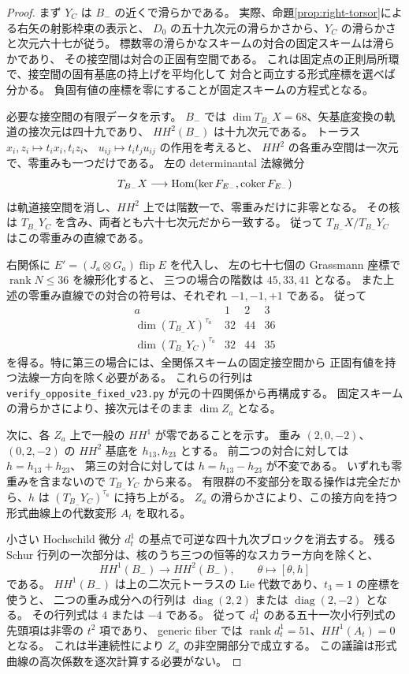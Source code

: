 \begin{proof}
まず $Y_C$ は $B_-$ の近くで滑らかである。
実際、命題\ref{prop:right-torsor}による右矢の射影枠束の表示と、
$D_0$ の五十九次元の滑らかさから、$Y_C$ の滑らかさと次元六十七が従う。
標数零の滑らかなスキームの対合の固定スキームは滑らかであり、
その接空間は対合の正固有空間である。
これは固定点の正則局所環で、接空間の固有基底の持上げを平均化して
対合と両立する形式座標を選べば分かる。
負固有値の座標を零にすることが固定スキームの方程式となる。

必要な接空間の有限データを示す。
$B_-$ では $\dim T_{B_-}X=68$、矢基底変換の軌道の接次元は四十九であり、
$HH^2(B_-)$ は十九次元である。
トーラス $x_i,z_i\mapsto t_ix_i,t_iz_i$、
$u_{ij}\mapsto t_it_ju_{ij}$ の作用を考えると、
$HH^2$ の各重み空間は一次元で、零重みも一つだけである。
左の determinantal 法線微分
\[
 T_{B_-}X\longrightarrow
 \operatorname{Hom}(\ker F_{E_-},\operatorname{coker} F_{E_-})
\]
は軌道接空間を消し、$HH^2$ 上では階数一で、零重みだけに非零となる。
その核は $T_{B_-}Y_C$ を含み、両者とも六十七次元だから一致する。
従って $T_{B_-}X/T_{B_-}Y_C$ はこの零重みの直線である。

右関係に $E'=(J_a\otimes G_a)\operatorname{flip}E$ を代入し、
左の七十七個の Grassmann 座標で $\operatorname{rank}N\le36$ を線形化すると、
三つの場合の階数は $45,33,41$ となる。
また上述の零重み直線での対合の符号は、それぞれ $-1,-1,+1$ である。
従って
\[
\begin{array}{c|ccc}
 a&1&2&3\\\hline
 \dim(T_{B_-}X)^{\tau_a}&32&44&36\\
 \dim(T_{B_-}Y_C)^{\tau_a}&32&44&35
\end{array}
\]
を得る。特に第三の場合には、全関係スキームの固定接空間から
正固有値を持つ法線一方向を除く必要がある。
これらの行列は \nolinkurl{verify_opposite_fixed_v23.py} が元の十四関係から再構成する。
固定スキームの滑らかさにより、接次元はそのまま $\dim Z_a$ となる。

次に、各 $Z_a$ 上で一般の $HH^1$ が零であることを示す。
重み $(2,0,-2)$、$(0,2,-2)$ の $HH^2$ 基底を $h_{13},h_{23}$ とする。
前二つの対合に対しては $h=h_{13}+h_{23}$、
第三の対合に対しては $h=h_{13}-h_{23}$ が不変である。
いずれも零重みを含まないので $T_{B_-}Y_C$ から来る。
有限群の不変部分を取る操作は完全だから、$h$ は $(T_{B_-}Y_C)^{\tau_a}$ に持ち上がる。
$Z_a$ の滑らかさにより、この接方向を持つ形式曲線上の代数変形 $A_t$ を取れる。

小さい Hochschild 微分 $d^1_t$ の基点で可逆な四十九次ブロックを消去する。
残る Schur 行列の一次部分は、核のうち三つの恒等的なスカラー方向を除くと、
\[
 HH^1(B_-)\longrightarrow HH^2(B_-),\qquad
 \theta\longmapsto[\theta,h]
\]
である。
$HH^1(B_-)$ は上の二次元トーラスの Lie 代数であり、$t_3=1$ の座標を使うと、
二つの重み成分への行列は $\operatorname{diag}(2,2)$ または $\operatorname{diag}(2,-2)$ となる。
その行列式は $4$ または $-4$ である。
従って $d^1_t$ のある五十一次小行列式の先頭項は非零の $t^2$ 項であり、
generic fiber では $\operatorname{rank}d^1_t=51$、$HH^1(A_t)=0$ となる。
これは半連続性により $Z_a$ の非空開部分で成立する。
この議論は形式曲線の高次係数を逐次計算する必要がない。


\end{proof}
